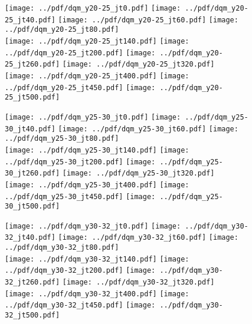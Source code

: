 \documentclass[landscape,10pt]{beamer} %
\begin{document}
\newpage

\begin{figure}[p]
\texttt{[image: ../pdf/dqm\_y20-25\_jt0.pdf]}
\texttt{[image: ../pdf/dqm\_y20-25\_jt40.pdf]}
\texttt{[image: ../pdf/dqm\_y20-25\_jt60.pdf]}
\texttt{[image: ../pdf/dqm\_y20-25\_jt80.pdf]}\\
\texttt{[image: ../pdf/dqm\_y20-25\_jt140.pdf]}
\texttt{[image: ../pdf/dqm\_y20-25\_jt200.pdf]}
\texttt{[image: ../pdf/dqm\_y20-25\_jt260.pdf]}
\texttt{[image: ../pdf/dqm\_y20-25\_jt320.pdf]}\\
\texttt{[image: ../pdf/dqm\_y20-25\_jt400.pdf]}
\texttt{[image: ../pdf/dqm\_y20-25\_jt450.pdf]}
\texttt{[image: ../pdf/dqm\_y20-25\_jt500.pdf]}
\end{figure}

\newpage

\begin{figure}[p]
\texttt{[image: ../pdf/dqm\_y25-30\_jt0.pdf]}
\texttt{[image: ../pdf/dqm\_y25-30\_jt40.pdf]}
\texttt{[image: ../pdf/dqm\_y25-30\_jt60.pdf]}
\texttt{[image: ../pdf/dqm\_y25-30\_jt80.pdf]}\\
\texttt{[image: ../pdf/dqm\_y25-30\_jt140.pdf]}
\texttt{[image: ../pdf/dqm\_y25-30\_jt200.pdf]}
\texttt{[image: ../pdf/dqm\_y25-30\_jt260.pdf]}
\texttt{[image: ../pdf/dqm\_y25-30\_jt320.pdf]}\\
\texttt{[image: ../pdf/dqm\_y25-30\_jt400.pdf]}
\texttt{[image: ../pdf/dqm\_y25-30\_jt450.pdf]}
\texttt{[image: ../pdf/dqm\_y25-30\_jt500.pdf]}
\end{figure}

\newpage

\begin{figure}[p]
\texttt{[image: ../pdf/dqm\_y30-32\_jt0.pdf]}
\texttt{[image: ../pdf/dqm\_y30-32\_jt40.pdf]}
\texttt{[image: ../pdf/dqm\_y30-32\_jt60.pdf]}
\texttt{[image: ../pdf/dqm\_y30-32\_jt80.pdf]}\\
\texttt{[image: ../pdf/dqm\_y30-32\_jt140.pdf]}
\texttt{[image: ../pdf/dqm\_y30-32\_jt200.pdf]}
\texttt{[image: ../pdf/dqm\_y30-32\_jt260.pdf]}
\texttt{[image: ../pdf/dqm\_y30-32\_jt320.pdf]}\\
\texttt{[image: ../pdf/dqm\_y30-32\_jt400.pdf]}
\texttt{[image: ../pdf/dqm\_y30-32\_jt450.pdf]}
\texttt{[image: ../pdf/dqm\_y30-32\_jt500.pdf]}
\end{figure}
\end{document}
